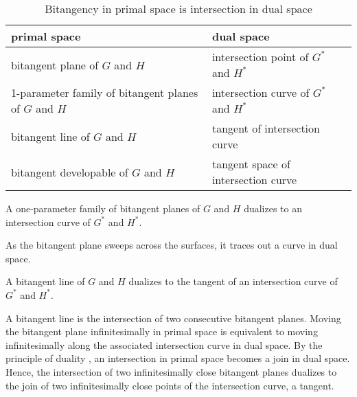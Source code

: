 \documentclass[12pt]{article}
\newif\ifJournal
\begin{document}
\begin{table*}[b]
\centering
\begin{tabular}{|l|l|}
\hline
primal space & dual space \\
\hline \hline
bitangent plane of $G$ and $H$ & intersection point of $G^*$ and $H^*$ \\ \hline
1-parameter family of bitangent planes of $G$ and $H$ &
	intersection curve of $G^*$ and $H^*$ \\ \hline
bitangent line of $G$ and $H$ & tangent of intersection curve \\ \hline
bitangent developable of $G$ and $H$ & tangent space of intersection curve \\ \hline
\end{tabular}
\caption{Bitangency in primal space is intersection in dual space}
\label{tbl:duality}
\end{table*}

\begin{corollary}
\label{cor:family}
A one-parameter family of bitangent planes of $G$ and $H$ dualizes
to an intersection curve of $G^*$ and $H^*$.
\end{corollary}
\prf
As the bitangent plane sweeps across the surfaces,
it traces out a curve in dual space.
\QED

\begin{lemma}
\label{lem:biline}
A bitangent line of $G$ and $H$ dualizes to the tangent of an intersection
curve of $G^*$ and $H^*$.
\end{lemma}
\prf
A bitangent line is the intersection of two consecutive bitangent planes.
Moving the bitangent plane infinitesimally in primal space is equivalent to
moving infinitesimally along the associated intersection curve in dual space.
By the principle of duality \cite{pedoe70},	%
an intersection in primal space becomes a join in dual space.
Hence, the intersection of two infinitesimally close bitangent planes
dualizes to the join of two infinitesimally close points of the intersection 
curve, a tangent.
\QED

\ifJournal
\begin{rmk}
We recall that lines dualize to lines \cite{pedoe70}.\footnote{The
	intersection of 2 planes $P$ and $Q$  
	in primal space (a line) dualizes to the join of the dual points $P^*$ 
	and $Q*$ in dual space (also a line).}
We know then that a bitangent of $A$ and $B$ dualizes to a line.
\end{rmk}
\fi
\end{document}
